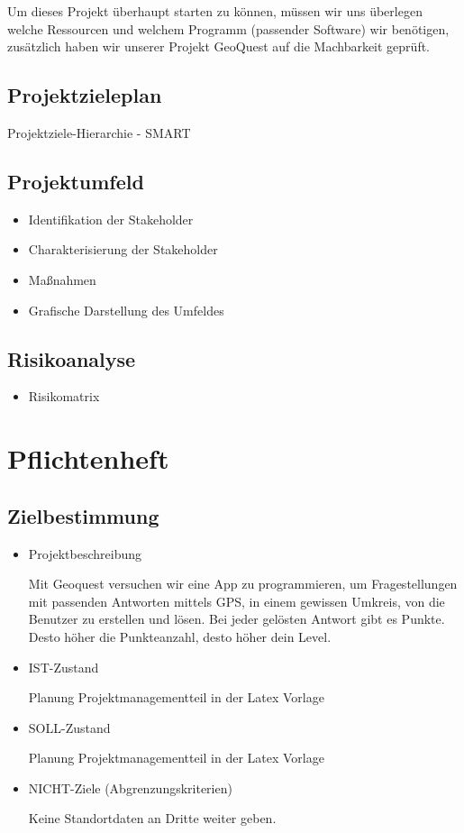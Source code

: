Um dieses Projekt überhaupt starten zu können, müssen wir uns überlegen welche Ressourcen und welchem Programm (passender Software) wir benötigen, zusätzlich haben wir unserer Projekt GeoQuest auf die Machbarkeit geprüft.

\subsection{Projektzieleplan}
Projektziele-Hierarchie - SMART
\subsection{Projektumfeld}
\begin{itemize}
	\item Identifikation der Stakeholder
	\item Charakterisierung der Stakeholder
	\item Maßnahmen
	\item Grafische Darstellung des Umfeldes
\end{itemize}
\subsection{Risikoanalyse}
\begin{itemize}
	\item Risikomatrix
\end{itemize}
\section{Pflichtenheft}
\subsection{Zielbestimmung}
\begin{itemize}
	\item Projektbeschreibung
	
	Mit Geoquest versuchen wir eine App zu programmieren, um Fragestellungen mit passenden Antworten
	mittels GPS, in einem gewissen Umkreis, von die Benutzer zu erstellen und lösen. Bei jeder gelösten
	Antwort gibt es Punkte. Desto höher die Punkteanzahl, desto höher dein Level.
	
	\item IST-Zustand
	
	Planung Projektmanagementteil in der Latex Vorlage
	
	\item SOLL-Zustand
	
    Planung Projektmanagementteil in der Latex Vorlage
    	
	\item NICHT-Ziele (Abgrenzungskriterien)	

	Keine Standortdaten an Dritte weiter geben.
	
\end{itemize}
